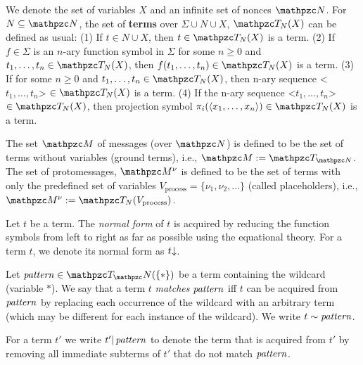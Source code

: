 \begin{definition}[Terms]\label{def:terms}
  We denote the set of variables $X$ and an infinite set of nonces $\nonces$. For $N\subseteq\nonces$, the set of \textbf{terms} over $\Sigma\cup N\cup X$, $\gterms_N(X)$ can be defined as usual: 
  (1) If $t\in N\cup X$, then $t \in \gterms_N(X)$ is a term. 
  (2) If $f \in \Sigma$ is an $n$-ary function symbol in $\Sigma$ for some $n\ge 0$ and  $t_1,\ldots,t_n \in \gterms_N(X)$, then $f(t_1,\ldots,t_n) \in \gterms_N(X)$ is a term.
  (3) If for some $n\ge 0$ and  $t_1,\ldots,t_n \in \gterms_N(X)$, then n-ary sequence <$t_1,\ldots,t_n$> $\in \gterms_N(X)$ is a term. 
  (4) If the n-ary sequence <$t_1,\ldots,t_n$> $\in \gterms_N(X)$, then projection symbol $\pi_i(\an{x_1,\dots,x_n}) \in \gterms_N(X)$ is a term.
\end{definition}

\begin{definition}\label{def:messages}
  The set $\messages$ of messages (over $\nonces$) is defined to be
  the set of terms without variables (ground terms), i.e., $\messages :=\gterms_{\nonces}$.
  The set of protomessages, $\messages^\nu$ is defined to be the set of terms with only the predefined set of variables $V_{\text{process}} = \{\nu_1, \nu_2, \dots\}$ (called placeholders), i.e., $\messages^\nu := \gterms_N(V_{\text{process}})$.
\end{definition}

\begin{definition}
  Let $t$ be a term. The \emph{normal form} of $t$ is acquired by reducing the function symbols from left to right as far as possible  using the equational theory. For a term $t$, we denote its normal form as $t{\downarrow}$.
\end{definition}

\begin{definition}
  Let $\mi{pattern} \in \terms(\{*\})$ be a term containing the
  wildcard (variable $*$). We say that a term $t$ \emph{matches}
  $\mathit{pattern}$ iff $t$ can be acquired from $\mathit{pattern}$ by
  replacing each occurrence of the wildcard with an arbitrary term
  (which may be different for each instance of the wildcard). We write
  $t \sim \mathit{pattern}$.

  For a term $t'$ we write $t'|\, \mathit{pattern}$ to denote the term
  that is acquired from $t'$ by removing all immediate subterms of
  $t'$ that do not match $\mathit{pattern}$.
\end{definition}


